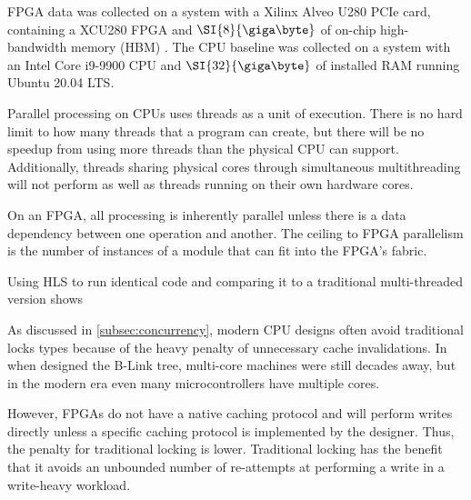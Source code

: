 
FPGA data was collected on a system with a Xilinx Alveo U280 PCIe card,
containing a XCU280 FPGA and $\SI{8}{\giga\byte}$ of on-chip high-bandwidth
memory (HBM) \autocite{u280}. The CPU baseline was collected on a system with an
Intel Core i9-9900 CPU and $\SI{32}{\giga\byte}$ of installed RAM running Ubuntu
20.04 LTS.



Parallel processing on CPUs uses threads as a unit of execution. There is no
hard limit to how many threads that a program can create, but there will be no
speedup from using more threads than the physical CPU can support. Additionally,
threads sharing physical cores through simultaneous multithreading will not
perform as well as threads running on their own hardware cores.

On an FPGA, all processing is inherently parallel unless there is a data
dependency between one operation and another. The ceiling to FPGA parallelism is
the number of instances of a module that can fit into the FPGA's fabric.

Using HLS to run identical code and comparing it to a traditional multi-threaded
version shows \todo{\ldots}



As discussed in \autoref{subsec:concurrency}, modern CPU designs often avoid
traditional locks types because of the heavy penalty of unnecessary cache
invalidations. In \citeyear{b-link} when \citeauthor{b-link} designed the B-Link
tree, multi-core machines were still decades away, but in the modern era even
many microcontrollers have multiple cores.

However, FPGAs do not have a native caching protocol and will perform writes
directly unless a specific caching protocol is implemented by the designer.
Thus, the penalty for traditional locking is lower. Traditional locking has the
benefit that it avoids an unbounded number of re-attempts at performing a write
in a write-heavy workload.





